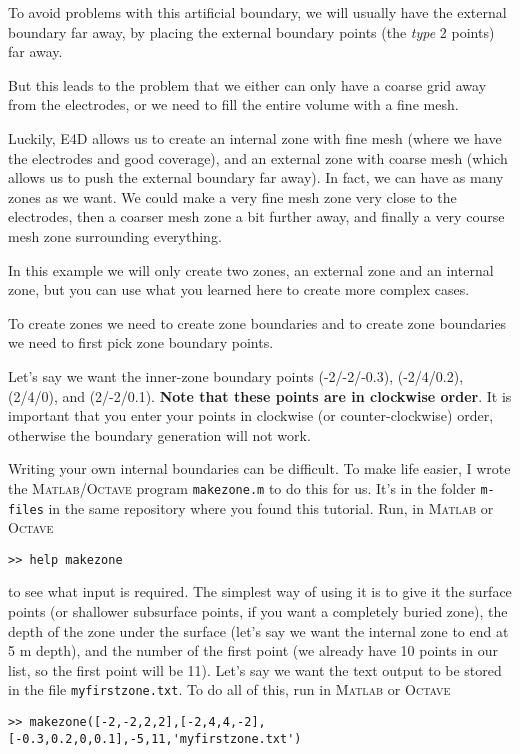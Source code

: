 \documentclass[11pt]{article}
\begin{document}
To avoid problems with this artificial boundary, we will usually have
the external boundary far away, by placing the external boundary
points (the \emph{type} 2 points) far away.

But this leads to the problem that we either can only have a coarse
grid away from the electrodes, or we need to fill the entire volume
with a fine mesh.

Luckily, E4D allows us to create an internal zone with fine mesh
(where we have the electrodes and good coverage), and an external
zone with coarse mesh (which allows us to push the external boundary
far away). In fact, we can have as many zones as we want. We could
make a very fine mesh zone very close to the electrodes, then a
coarser mesh zone a bit further away, and finally a very course mesh
zone surrounding everything.

In this example we will only create two zones, an external zone and an
internal zone, but you can use what you learned here to create more
complex cases.

To create zones we need to create zone boundaries and to create zone
boundaries we need to first pick zone boundary points.

Let's say we want the inner-zone boundary points (-2/-2/-0.3),
(-2/4/0.2), (2/4/0), and (2/-2/0.1). \textbf{Note that these points
  are in clockwise order}. It is important that you enter your points
in clockwise (or counter-clockwise) order, otherwise the boundary
generation will not work.

Writing your own internal boundaries can be difficult. To make life
easier, I wrote the \textsc{Matlab}/\textsc{Octave} program
\verb+makezone.m+ to do this for us. It's in the folder \verb+m-files+
in the same repository where you found this tutorial. Run, in
\textsc{Matlab} or \textsc{Octave}

\qquad \verb+>> help makezone+

to see what input is required. The simplest way of using it is to give
it the surface points (or shallower subsurface points, if you want a completely
buried zone), the depth of the zone under the surface (let's say we
want the internal zone to end at 5 m depth), and the number of
the first point (we already have 10 points in our list, so the first
point will be 11).  Let's say we want the text output to be stored in
the file \verb+myfirstzone.txt+. To do all of this, run in
\textsc{Matlab} or \textsc{Octave}

\qquad \verb+>> makezone([-2,-2,2,2],[-2,4,4,-2],[-0.3,0.2,0,0.1],-5,11,'myfirstzone.txt')+
\end{document}
